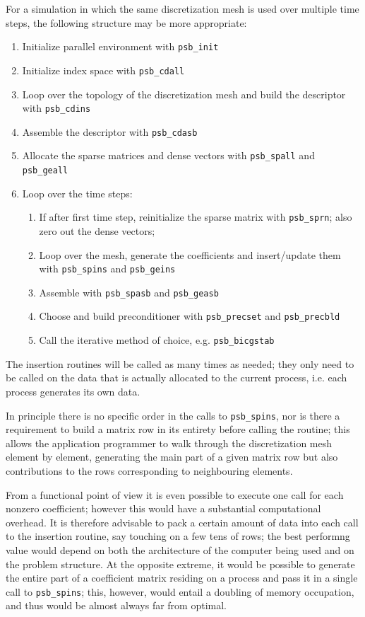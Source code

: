 For a simulation in which the same discretization mesh is used over
multiple time steps, the following structure may be more appropriate:
\begin{enumerate}
\item Initialize parallel environment with \verb|psb_init|
\item Initialize index space with \verb|psb_cdall|
\item Loop over the topology of the discretization mesh and build the
  descriptor with \verb|psb_cdins|
\item Assemble the descriptor with \verb|psb_cdasb|
\item Allocate the sparse matrices and dense vectors with
  \verb|psb_spall| and \verb|psb_geall|
\item Loop over the time steps: 
\begin{enumerate}
\item If after first time step, 
  reinitialize the sparse matrix with \verb|psb_sprn|; also zero out
  the dense vectors;
\item Loop over the mesh, generate the coefficients and insert/update
  them with \verb|psb_spins| and \verb|psb_geins|
\item Assemble with \verb|psb_spasb| and \verb|psb_geasb|
\item Choose and build preconditioner with \verb|psb_precset| and
  \verb|psb_precbld|
\item Call the iterative method of choice, e.g. \verb|psb_bicgstab|
 \end{enumerate}
\end{enumerate}
The insertion routines will be called as many times as needed; 
they only need to  be called on the data that is actually
allocated to the current process, i.e. each process generates its own
data. 

In principle there is no specific order in the calls to
\verb|psb_spins|, nor is there a requirement to build a matrix row in
its entirety before calling the routine; this allows the application
programmer to walk through the discretization mesh element by element,
generating the main part of a given matrix row but also contributions
to the rows corresponding to neighbouring elements. 

From a functional point of view it is even possible to execute one
call for each nonzero coefficient; however this would have a
substantial computational overhead. It is therefore advisable to pack
a certain amount of data into each call to the insertion routine, say
touching on a few tens of rows; the best performng value would depend
on both the architecture of the computer being used and on the problem
structure. 
At the opposite extreme, it would be possible to generate the entire
part of a coefficient matrix residing on a process and pass it in a
single call to \verb|psb_spins|; this, however, would entail a
doubling of memory occupation, and thus would be almost always far
from optimal. 

